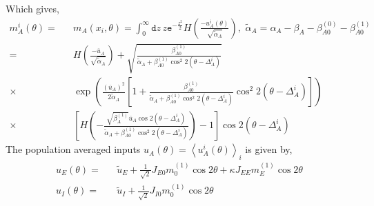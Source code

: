 \documentclass[a4paper]{article}
\begin{document}
Which gives, 
\begin{eqnarray}
m_A^i(\theta) =&& m_A(x_i, \theta) = \int_{0}^{\infty} \mathtt{d} z\,  z \mathtt{e}^{-\frac{z^2}{2}} H\left( \frac{-u_A^i(\theta)}{\sqrt{\tilde{\alpha}_A }} \right), \,\, \tilde{\alpha}_A = \alpha_A - \beta_A - \beta_{A0}^{(0)} - \beta_{A0}^{(1)}  \\
=&& H\left( \frac{-\overline{u}_A }{\sqrt{\tilde{\alpha}_A }}  \right) + \sqrt{\frac{\beta_{A0}^{(1)} }{  \tilde{\alpha}_A + \beta_{A0}^{(1)} \cos^2 2 (\theta - \Delta_A^i) }} \nonumber \\ 
\times&&  \exp \left( \frac{\left( \overline{u}_A \right)^2  }{ 2 \tilde{\alpha}_A} \left[ 1 + \frac{\beta_{A0}^{(1)} }{ \tilde{\alpha}_A + \beta_{A0}^{(1)} \cos^2 2 (\theta - \Delta_A^i)  } \cos^2 2 (\theta - \Delta_A^i) \right] \right) \nonumber \\
\times&& \left[ H \left( - \frac{ \sqrt{\beta_A^{(1)} } \overline{u}_A \cos 2 (\theta - \Delta_A^i)} {  \tilde{\alpha}_A + \beta_{A0}^{(1)} \cos^2 2 (\theta - \Delta_A^i) } \right) - 1 \right] \cos2(\theta - \Delta_A^i) \label{mAiofTheta} 
\end{eqnarray}
The population averaged inputs $u_A(\theta) = \left\langle u_A^i(\theta) \right\rangle_{i}$ is given by, 
\begin{eqnarray}
u_E(\theta) =&& \tilde{u}_E + \frac{1}{\sqrt{2}} J_{E0} m_0^{(1)} \cos 2 \theta + \kappa J_{EE} m_E^{(1)} \cos 2 \theta \\
u_I(\theta) =&& \tilde{u}_I + \frac{1}{\sqrt{2}} J_{I0} m_0^{(1)} \cos 2 \theta 
\end{eqnarray}
\end{document}
